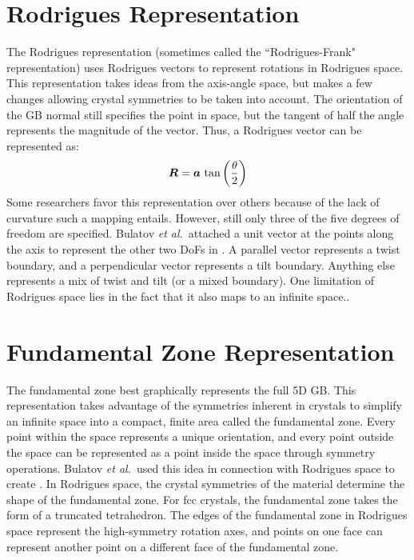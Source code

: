 \documentclass[12pt]{report}
\begin{document}
\section{Rodrigues Representation\label{GBReps:Rodrigues}}
The Rodrigues representation (sometimes called the ``Rodrigues-Frank" representation) uses Rodrigues vectors to represent rotations in Rodrigues space.  This representation takes ideas from the axis-angle space, but makes a few changes allowing crystal symmetries to be taken into account.  The orientation of the GB normal still specifies the point in space, but the tangent of half the angle represents the magnitude of the vector. Thus, a Rodrigues vector can be represented as:\cite{morawiec1996, becker1989, frank1988, randle2000, priester2013}
\begin{equation}
\bm{R}=\bm{a}\ \textnormal{tan}\left(\frac{\theta}{2}\right)
\label{eq:rodriguesVec}
\end{equation}
Some researchers favor this representation over others because of the lack of curvature such a mapping entails.\cite{frank1988, randle2000}  However, still only three of the five degrees of freedom are specified.  Bulatov \emph{et al.}\ attached a unit vector at the points along the axis to represent the other two DoFs in . A parallel vector represents a twist boundary, and a perpendicular vector represents a tilt boundary.  Anything else represents a mix of twist and tilt (or a mixed boundary).  One limitation of Rodrigues space lies in the fact that it also maps to an infinite space.\cite{frank1988, kirch2008}.

\section{Fundamental Zone Representation\label{GBReps:FunZone}}
The fundamental zone best graphically represents the full 5D GB.  This representation takes advantage of the symmetries inherent in crystals\cite{stokes2007} to simplify an infinite space into a compact, finite area called the fundamental zone.\cite{bulatov2014, patala2013, homer2015, morawiec1996, patala2012}  Every point within the space represents a unique orientation, and every point outside the space can be represented as a point inside the space through symmetry operations.\cite{morawiec1996, becker1989, frank1988}  Bulatov \emph{et al.}\ used this idea in connection with Rodrigues space to create .  In Rodrigues space, the crystal symmetries of the material determine the shape of the fundamental zone.\cite{patala2013, morawiec1996}  For fcc crystals, the fundamental zone takes the form of a truncated tetrahedron.\cite{bulatov2014}  The edges of the fundamental zone in Rodrigues space represent the high-symmetry rotation axes, and points on one face can represent another point on a different face of the fundamental zone.  
\end{document}

